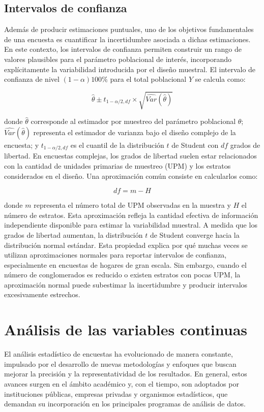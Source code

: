 \documentclass[
  spanish,
  12pt,
]{book}
\begin{document}
\section{Intervalos de confianza}\label{intervalos-de-confianza}

Además de producir estimaciones puntuales, uno de los objetivos fundamentales de una encuesta es cuantificar la incertidumbre asociada a dichas estimaciones. En este contexto, los intervalos de confianza permiten construir un rango de valores plausibles para el parámetro poblacional de interés, incorporando explícitamente la variabilidad introducida por el diseño muestral. El intervalo de confianza de nivel \((1-\alpha)100\%\) para el total poblacional \(Y\) se calcula como:

\[
\hat{\theta} \pm t_{1-\alpha/2, df} \times \sqrt{\widehat{Var}(\hat{\theta})}
\]

donde \(\hat{\theta}\) corresponde al estimador por muestreo del parámetro poblacional \(\theta\); \(\widehat{Var}(\hat{\theta})\) representa el estimador de varianza bajo el diseño complejo de la encuesta; y \(t_{1-\alpha/2, df}\) es el cuantil de la distribución \(t\) de Student con \(df\) grados de libertad. En encuestas complejas, los grados de libertad suelen estar relacionados con la cantidad de unidades primarias de muestreo (UPM) y los estratos considerados en el diseño. Una aproximación común consiste en calcularlos como:

\[
df = m - H
\]

donde \(m\) representa el número total de UPM observadas en la muestra y \(H\) el número de estratos. Esta aproximación refleja la cantidad efectiva de información independiente disponible para estimar la variabilidad muestral. A medida que los grados de libertad aumentan, la distribución \(t\) de Student converge hacia la distribución normal estándar. Esta propiedad explica por qué muchas veces se utilizan aproximaciones normales para reportar intervalos de confianza, especialmente en encuestas de hogares de gran escala. Sin embargo, cuando el número de conglomerados es reducido o existen estratos con pocas UPM, la aproximación normal puede subestimar la incertidumbre y producir intervalos excesivamente estrechos.

\chapter{Análisis de las variables continuas}\label{cap3}

El análisis estadístico de encuestas ha evolucionado de manera constante, impulsado por el desarrollo de nuevas metodologías y enfoques que buscan mejorar la precisión y la representatividad de los resultados. En general, estos avances surgen en el ámbito académico y, con el tiempo, son adoptados por instituciones públicas, empresas privadas y organismos estadísticos, que demandan su incorporación en los principales programas de análisis de datos.
\end{document}
